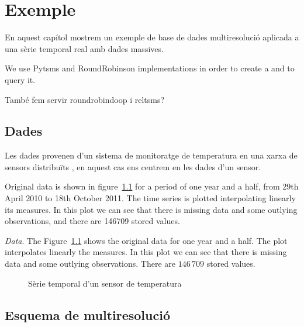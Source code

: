 \chapter{Exemple}
\label{sec:implementacions:exemple}

En aquest capítol mostrem un exemple de base de dades multiresolució
aplicada a una sèrie temporal real amb dades massives.  

\todo{}
We use Pytsms and
RoundRobinson implementations in order to create a  and
to query it.

També fem servir roundrobindoop i reltsms?




\section{Dades}



Les dades provenen d'un sistema de monitoratge de temperatura en una
xarxa de sensors distribuïts \parencite{alippi10}, en aquest cas ens
centrem en les dades d'un sensor.


Original data is shown in figure~\ref{fig:exemple:original} for a
period of one year and a half, from 29th April 2010 to 18th October
2011.  The time series is plotted interpolating linearly its measures.
In this plot we can see that there is missing data and some outlying
observations, and there are 146709 stored values.



\emph{Data}. The Figure~\ref{fig:exemple:original} shows the original
data for one year and a half. The plot interpolates linearly the
measures. In this plot we can see that there is missing data and some
outlying observations. There are $146\,709$ stored values.



\begin{figure}[tp]
  \centering
  
  \caption{Sèrie temporal d'un sensor de temperatura}
  \label{fig:exemple:original}
\end{figure}





\section{Esquema de multiresolució}



